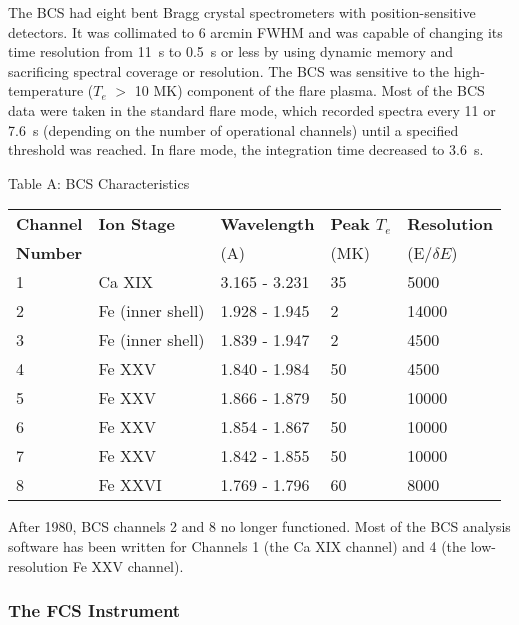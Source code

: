 The BCS had eight bent Bragg crystal spectrometers with position-sensitive
detectors. It was collimated to 6 arcmin FWHM and was capable of changing its
time resolution from 11~s to 0.5~s or less by using dynamic memory and
sacrificing spectral coverage or resolution. The BCS was sensitive to the
high-temperature ($T_e$ $>$ 10 MK) component of the flare plasma. Most of the
BCS data were taken in the standard flare mode, which recorded spectra every 11
or 7.6~s (depending on the number of operational channels) until a specified
threshold was reached. In flare mode, the integration time decreased to
3.6~s.

\begin{center}
                     Table A: BCS Characteristics
\bigskip
\begin{tabular}{||l l l l l ||}
\hline
{\bf Channel} &  {\bf Ion Stage} &   {\bf Wavelength}  &   {\bf Peak $T_e$} &
{\bf Resolution} \\
{\bf Number}  &                  &         (A)         &   (MK)  &(E/$\delta E$)  \\
\hline
   1  &    Ca XIX          &  3.165 - 3.231   &    35     &        5000  \\
   2  &    Fe (inner shell)&  1.928 - 1.945   &     2     &       14000  \\
   3  &    Fe (inner shell)&  1.839 - 1.947   &     2     &        4500  \\
   4  &    Fe XXV          &  1.840 - 1.984   &    50     &        4500  \\
   5  &    Fe XXV          &  1.866 - 1.879   &    50     &       10000  \\
   6  &    Fe XXV          &  1.854 - 1.867   &    50     &       10000  \\
   7  &    Fe XXV          &  1.842 - 1.855   &    50     &       10000  \\
   8  &    Fe XXVI         &  1.769 - 1.796   &    60     &        8000  \\
\hline
\end{tabular}
\end{center}

After 1980, BCS channels 2 and 8 no longer functioned. Most of the BCS analysis
software has been written for Channels 1 (the Ca XIX channel) and 4 (the
low-resolution Fe XXV channel).

\subsubsection{The FCS Instrument}


